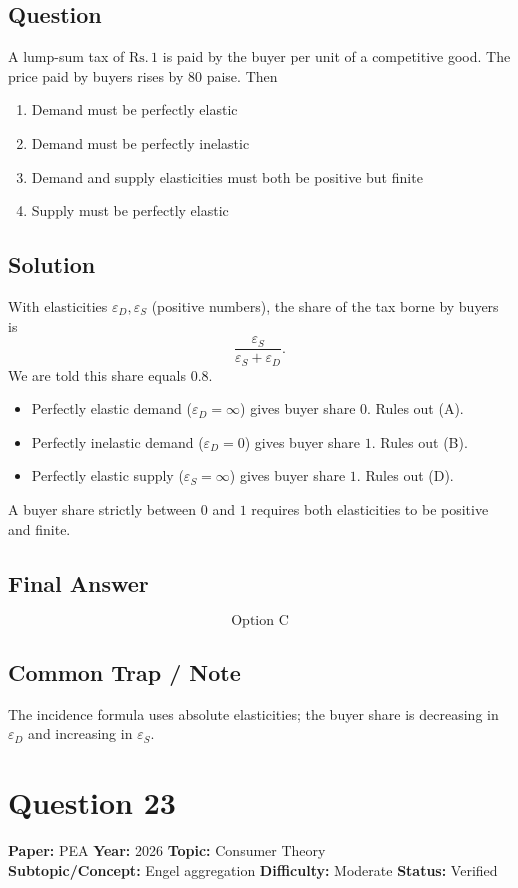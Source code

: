\documentclass[11pt]{article}
\begin{document}
\subsection*{Question}
A lump-sum tax of $\mathrm{Rs.}\,1$ is paid by the buyer per unit of a competitive good.
The price paid by buyers rises by $80$ paise. Then
\begin{enumerate}[label=(\Alph*)]
\item Demand must be perfectly elastic
\item Demand must be perfectly inelastic
\item Demand and supply elasticities must both be positive but finite
\item Supply must be perfectly elastic
\end{enumerate}

\subsection*{Solution}
With elasticities $\varepsilon_D, \varepsilon_S$ (positive numbers), the share of
the tax borne by buyers is
\[
\frac{\varepsilon_S}{\varepsilon_S + \varepsilon_D}.
\]
We are told this share equals $0.8$.
\begin{itemize}
\item Perfectly elastic demand ($\varepsilon_D = \infty$) gives buyer share $0$. Rules out (A).
\item Perfectly inelastic demand ($\varepsilon_D = 0$) gives buyer share $1$. Rules out (B).
\item Perfectly elastic supply ($\varepsilon_S = \infty$) gives buyer share $1$. Rules out (D).
\end{itemize}
A buyer share strictly between $0$ and $1$ requires both elasticities to be
positive and finite.

\subsection*{Final Answer}
\[
\boxed{\text{Option C}}
\]

\subsection*{Common Trap / Note}
The incidence formula uses absolute elasticities; the buyer share is decreasing in $\varepsilon_D$ and increasing in $\varepsilon_S$.

\section*{Question 23}
\textbf{Paper:} PEA \quad \textbf{Year:} 2026 \quad \textbf{Topic:} Consumer Theory \\
\textbf{Subtopic/Concept:} Engel aggregation \quad
\textbf{Difficulty:} Moderate \quad \textbf{Status:} Verified
\end{document}
